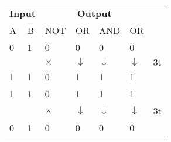 \begin{enumerate}
\begin{answer}
\begin{table}[H]
	\begin{tabular}{|p{1.5cm} p{1.5cm}|p{1.5cm}|p{1.5cm} |p{1.5cm}|p{1.5cm}|p{1.5cm}}
		\cline{1-6}
		\multicolumn{2}{|c|}{\textbf{Input }}&\multicolumn{4}{c|}{\textbf{Output }} & \\\cline{1-6}
		A&B&NOT & OR&AND&OR & \multirow{5}{*}{3t}\\\cline{1-6}
		0&1&0&0 & 0&0&\\
		& &$\times$&$\downarrow$ & $\downarrow$&$\downarrow$&\\ 
		1&1&0&1 & 1&1&\\ \cline{1-6}
		1&1&0&1 & 1&1&\\
		& &$\times$&$\downarrow$ & $\downarrow$&$\downarrow$&3t\\ 
		0&1&0&0 & 0&0&\\ \cline{1-6}
		

\end{tabular}
\end{table}
\end{answer}
\end{enumerate}
